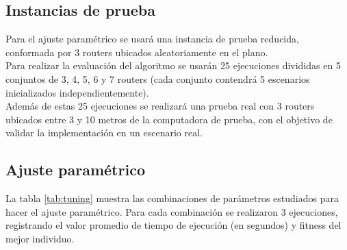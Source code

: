 \documentclass[journal]{IEEEtran}
\begin{document}
\subsection{Instancias de prueba}

Para el ajuste paramétrico se usará una instancia de prueba reducida, conformada por 3 routers ubicados aleatoriamente en el plano.\\

Para realizar la evaluación del algoritmo se usarán 25 ejecuciones divididas en 5 conjuntos de 3, 4, 5, 6 y 7 routers (cada conjunto contendrá 5 escenarios inicializados independientemente).\\

Además de estas 25 ejecuciones se realizará una prueba real con 3 routers ubicados entre 3 y 10 metros de la computadora de prueba, con el objetivo de validar la implementación en un escenario real.\\

\subsection{Ajuste paramétrico}

La tabla \ref{tab:tuning} muestra las combinaciones de parámetros estudiados para hacer el ajuste paramétrico. Para cada combinación se realizaron 3 ejecuciones, registrando el valor promedio de tiempo de ejecución (en segundos) y fitness del mejor individuo.
\end{document}
